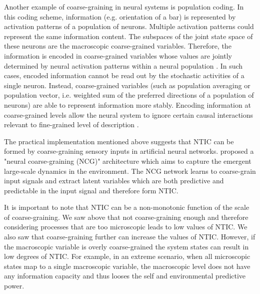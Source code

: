 \documentclass[utf8]{article}
\begin{document}
		Another example of coarse-graining in neural systems is population coding. In this coding scheme, information (e.g. orientation of a bar) is represented by activation patterns of a population of neurons. Multiple activation patterns could represent the same information content. The subspaces of the joint state space of these neurons are the macroscopic coarse-grained variables. Therefore, the information is encoded in coarse-grained variables whose values are jointly determined by neural activation patterns within a neural population \citep{kristan1997population, pouget2000information, binder2009encyclopedia, QuianQuiroga2009}. In such cases, encoded information cannot be read out by the stochastic activities of a single neuron. Instead, coarse-grained variables (such as population averaging or population vector, i.e. weighted sum of the preferred directions of a population of neurons) are able to represent information more stably. Encoding information at coarse-grained levels allow the neural system to ignore certain causal interactions relevant to fine-grained level of description \citep{Woodward2007-WOOCWA}.
			
			
		The practical implementation mentioned above suggests that  NTIC can be formed by coarse-graining sensory inputs in artificial neural networks. \citep{guttenberg2016neural} proposed a "neural coarse-graining (NCG)" architecture which aims to capture the emergent large-scale dynamics in the environment. The NCG network learns to coarse-grain input signals and extract latent variables which are both predictive and predictable in the input signal and therefore form NTIC.

		It is important to note that NTIC can be a non-monotonic function of the scale of coarse-graining. We saw above that not coarse-graining enough and therefore considering processes that are too microscopic leads to low values of NTIC. We also saw that coarse-graining further can increase the values of NTIC. However, if the macroscopic variable is overly coarse-grained the system states can result in low degrees of NTIC. For example, in an extreme scenario, when all microscopic states map to a single macroscopic variable, the macroscopic level does not have any information capacity and thus looses the self and environmental predictive power. 


        
\end{document}
